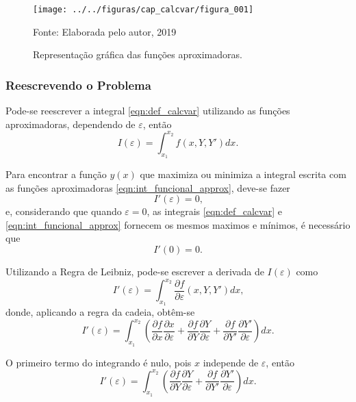 \documentclass{beamer}
\begin{document}
{
	\usebackgroundtemplate{}
	\begin{frame}
		\begin{figure}
			\caption{Representação gráfica das funções aproximadoras.}
			\begin{center}
				\texttt{[image: ../../figuras/cap\_calcvar/figura\_001]}\par
				{\small Fonte: Elaborada pelo autor, 2019}
			\end{center}
			\label{fig:func_approx}
		\end{figure}
	\end{frame}
}
	
\begin{frame}
	\frametitle{Reescrevendo o Problema}
	\justify
	
	Pode-se reescrever a integral \eqref{eqn:def_calcvar} utilizando as funções aproximadoras, dependendo de $\varepsilon$, então
	\begin{equation}
		\label{eqn:int_funcional_approx}
		I(\varepsilon)=\int_{x_1}^{x_2}f(x, Y, Y')dx\text{.}
	\end{equation}
	
	Para encontrar a função $y(x)$ que maximiza ou minimiza a integral escrita com as funções aproximadoras \eqref{eqn:int_funcional_approx}, deve-se fazer
	$$I'(\varepsilon)=0\text{,}$$
	e, considerando que quando $\varepsilon=0$, as integrais \eqref{eqn:def_calcvar} e \eqref{eqn:int_funcional_approx} fornecem os mesmos maximos e mínimos, é necessário que
	$$I'(0)=0\text{.}$$
\end{frame}

\begin{frame}
	\justify
	
	Utilizando a Regra de Leibniz, pode-se escrever a derivada de $I(\varepsilon)$ como
	$$I'(\varepsilon)=\int_{x_1}^{x_2} \frac{\partial f}{\partial \varepsilon} (x, Y, Y') dx \text{,}$$
	\pause
	donde, aplicando a regra da cadeia, obtêm-se
	$$I'(\varepsilon)=\int_{x_1}^{x_2}\left ( \frac{\partial f}{\partial x}\frac{\partial x}{\partial \varepsilon} + \frac{\partial f}{\partial Y} \frac{\partial Y}{\partial \varepsilon} + \frac{\partial f}{\partial Y'} \frac{\partial Y'}{\partial \varepsilon} \right )dx\text{.}$$
	\pause
	
	O primeiro termo do integrando é nulo, pois $x$ independe de $\varepsilon$, então
	$$
		I'(\varepsilon)=\int_{x_1}^{x_2}\left ( \frac{\partial f}{\partial Y}\frac{\partial Y}{\partial \varepsilon} + \frac{\partial f}{\partial Y'}\frac{\partial Y'}{\partial \varepsilon} \right ) dx \text{.}
	$$
\end{frame}
\end{document}
